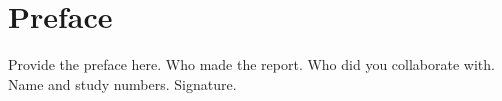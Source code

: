 \chapter{Preface}

Provide the preface here. Who made the report. Who did you collaborate with. Name and study numbers. Signature.

